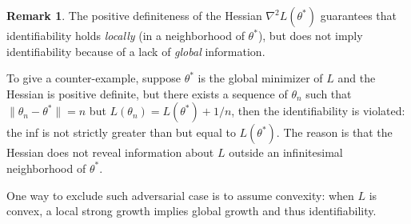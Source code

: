 \documentclass[11pt,letterpaper]{article}
\theoremstyle{definition}
\newtheorem{remark}{Remark}
\begin{document}
\begin{remark}
The positive definiteness of the Hessian $\nabla^2 L(\theta^\ast)$ guarantees that identifiability holds \emph{locally} (in a neighborhood of $\theta^\ast$), but does not imply identifiability because of a lack of \emph{global} information. 

To give a counter-example, suppose $\theta^\ast$ is the global minimizer of $L$ and the Hessian is positive definite, but there exists a sequence of $\theta_n$ such that $\|\theta_n-\theta^\ast\|=n$ but $L(\theta_n)=L(\theta^\ast)+1/n$, then the identifiability is violated: the inf is not strictly greater than but equal to $L(\theta^\ast)$. The reason is that the Hessian does not reveal information about $L$ outside an infinitesimal neighborhood of $\theta^\ast$.

One way to exclude such adversarial case is to assume convexity: when $L$ is convex, a local strong growth implies global growth and thus identifiability.
\end{remark}
%

% 


\end{document}
